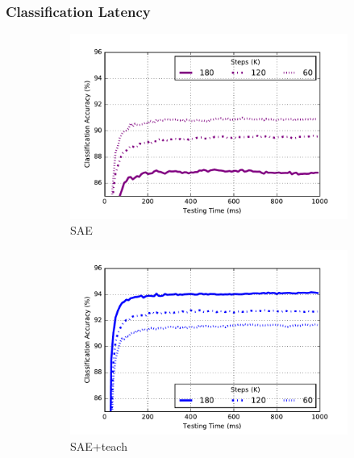 \subsubsection{Classification Latency}
\begin{figure}
	\centering
	\begin{subfigure}[t]{0.4\textwidth}
		\includegraphics[width=\textwidth]{pics_sdlm/40_MNIST_SAE_original/latency.pdf}
		\caption{SAE}
	\end{subfigure}
	\begin{subfigure}[t]{0.4\textwidth}
		\includegraphics[width=\textwidth]{pics_sdlm/41_MNIST_SAE_teach/latency.pdf}
		\caption{SAE+teach}
	\end{subfigure}\\
	\begin{subfigure}[t]{0.4\textwidth}

\end{subfigure}
\end{figure}
